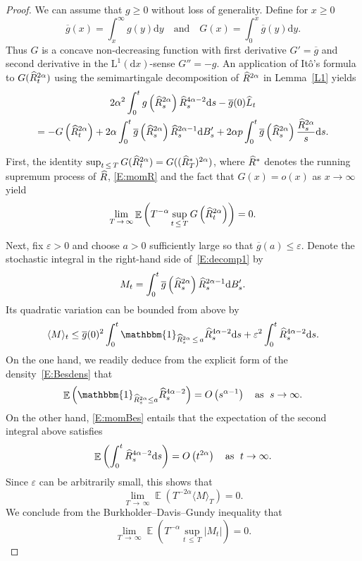 \documentclass[10pt]{amsart}
\theoremstyle{definition}\newtheorem{defi}[theo]{Definition}\newtheorem{rema}[theo]{Remark}\newtheorem{exam}[theo]{Example}\newtheorem{exem}[theo]{Example}\newtheorem{nota}[theo]{Notation}
\renewcommand{\bar}[1]{\overline{#1}}
\renewcommand{\hat}[1]{\widehat{#1}}
\newcommand{\dd}{\mathrm{d}}
\newcommand{\rmL}{\mathrm{L}}
\DeclareMathOperator{\E}{\mathbb{E}}
\newcommand{\bbmun}{\mathbbm{1}}
\let\oldhat\hat
\renewcommand*{\hat}[1]{\mathchoice{\widehat{#1}}{\widehat{#1}}{\oldhat{#1}}{\oldhat{#1}}}
\begin{document}
\begin{proof}
We can assume that $g\geq 0$ without loss of generality. Define for $x\geq 0$
\[
\bar g(x)=\int_x^{\infty} g(y)\dd y\quad \text{and} \quad G(x) = \int_0^x \bar g(y) \dd y.
\]
Thus $G$ is a concave non-decreasing function with first derivative $G'=\bar g$ and second derivative in the $\rmL^1(\dd x)$-sense $G'' =-g$. An application of Itô's formula to $G(\hat R_t^{2\alpha})$ using the semimartingale decomposition of $\hat R^{2\alpha}$ in Lemma~\ref{L1} yields
\begin{multline}\label{E:decomp1}
 2\alpha^2 \int_0^t g\left(\hat R^{2\alpha}_s\right)\hat R_s^{4\alpha-2} \dd s
- \bar g(0) \hat{L}_t \\
=  - G\left(\hat R_t^{2\alpha}\right) + 2\alpha \int_0^t \bar g\left(\hat R^{2\alpha}_s\right) \hat R_s^{2\alpha-1} \dd B'_s + 2\alpha p \int_0^t \bar g\left(\hat R^{2\alpha}_s\right) \frac{\hat R^{2\alpha}_s}{s} \dd s.
\end{multline}

First, the identity $\sup_{t\,\leq\,T} G(\hat R_t^{2\alpha})= G((\hat R^*_T)^{2\alpha})$, where $ \hat R^*$ denotes the running supremum process of $\hat R$, \eqref{E:momR} and the fact that $G(x)=o(x)$ as $x\to \infty$ yield
\[
\lim_{T\,\to\,\infty} \E\left(T^{-\alpha} \sup_{t\,\leq\,T} G\left(\hat R_t^{2\alpha}\right)\right)=0.
\]

Next, fix $\varepsilon>0$ and choose $a>0$ sufficiently large so that $\bar g(a)\leq \varepsilon$. Denote the stochastic integral in the right-hand side of~\eqref{E:decomp1} by
\[
M_t= \int_0^t \bar g\left(\hat R^{2\alpha}_s\right) \hat R_s^{2\alpha-1} \dd B'_s.
\]
Its quadratic variation can be bounded from above by
\[
\langle M \rangle_t\leq \bar g(0)^2\int_0^t \bbmun_{\hat R^{2\alpha}_s\,\leq\,a} \hat R_s^{4\alpha-2} \dd s
+ \varepsilon^2 \int_0^t \hat R_s^{4\alpha-2} \dd s.
\]
On the one hand, we readily deduce from the explicit form of the density~\eqref{E:Besdens} that
\[
\E\left(\bbmun_{\hat R^{2\alpha}_s\leq a} \hat R_s^{4\alpha-2}\right)= O\left(s^{\alpha-1}\right) \quad \text{as }\;s\to \infty.
\]
On the other hand, \eqref{E:momBes} entails that the expectation of the second integral above satisfies
\[
\E\left(\int_0^t \hat R_s^{4\alpha-2} \dd s\right) = O\left(t^{2\alpha}\right)\quad \text{as }\;t\to \infty.
\]
Since $\varepsilon$ can be arbitrarily small, this shows that
\[
\lim_{T\,\to\,\infty} \E(T^{-2\alpha} \langle M \rangle_T)=0.
\]
We conclude from the Burkholder--Davis--Gundy inequality that
\[
\lim_{T\,\to\,\infty} \E\left(T^{-\alpha} \sup_{t\,\leq\,T} |M_t|\right)=0.
\]




\end{proof}
\end{document}
